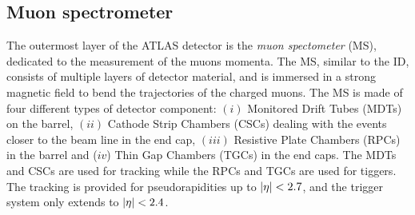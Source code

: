 \documentclass[12pt, a4paper]{book}
\begin{document}
\subsection{Muon spectrometer}\label{sec:MS}
The outermost layer of the ATLAS detector is the \textit{muon spectometer} (MS), dedicated to the measurement of the muons momenta. The MS, similar to the ID, consists of multiple layers of detector material, 
and is immersed in a strong magnetic field to bend the trajectories of the charged muons. The MS is made of four different types of detector component: $(i)$ Monitored Drift Tubes (MDTs) on the barrel, 
$(ii)$ Cathode Strip Chambers (CSCs) dealing with the events closer to the beam line in the end cap, $(iii)$ Resistive Plate Chambers (RPCs) in the barrel and ($iv$) Thin Gap Chambers (TGCs) in the end caps. 
The MDTs and CSCs are used for tracking while the RPCs and TGCs are used for tiggers. The tracking is provided for pseudorapidities up to $\abs{\eta}<2.7$, and the trigger system only extends to $\abs{\eta}<2.4$.
\end{document}
